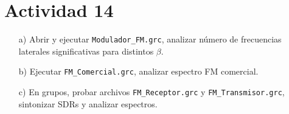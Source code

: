 \section{Actividad 14}

\begin{itemize}
    \item[a)] Abrir y ejecutar \texttt{Modulador\_FM.grc}, analizar número de frecuencias laterales significativas para distintos $\beta$.  
    \item[b)] Ejecutar \texttt{FM\_Comercial.grc}, analizar espectro FM comercial.  
    \item[c)] En grupos, probar archivos \texttt{FM\_Receptor.grc} y \texttt{FM\_Transmisor.grc}, sintonizar SDRs y analizar espectros.  
\end{itemize}